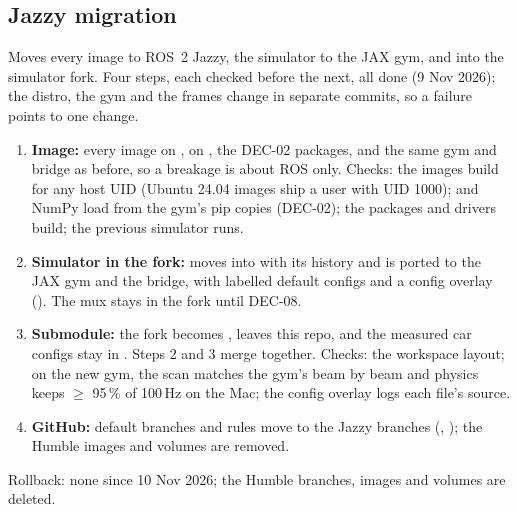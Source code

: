 \documentclass[11pt,a4paper]{article}
\begin{document}
\subsection{Jazzy migration}\label{sec:migration}
Moves every image to ROS~2 Jazzy, the simulator to the JAX gym, and  into the simulator fork. Four steps, each checked before the next, all done (9 Nov 2026); the distro, the gym and the frames change in separate commits, so a failure points to one change.
\begin{enumerate}
  \item \textbf{Image:} every image on ,  on , the DEC-02 packages, and the same gym and bridge as before, so a breakage is about ROS only. Checks: the images build for any host UID (Ubuntu 24.04 images ship a user with UID 1000);  and NumPy load from the gym's pip copies (DEC-02); the packages and drivers build; the previous simulator runs.
  \item \textbf{Simulator in the fork:}  moves into  with its history and is ported to the JAX gym and the  bridge, with labelled default configs and a config overlay (). The mux stays in the fork until DEC-08.
  \item \textbf{Submodule:} the fork becomes ,  leaves this repo, and the measured car configs stay in . Steps 2 and 3 merge together. Checks: the workspace layout; on the new gym, the scan matches the gym's beam by beam and physics keeps $\geq$ 95\,\% of 100\,Hz on the Mac; the config overlay logs each file's source.
  \item \textbf{GitHub:} default branches and rules move to the Jazzy branches (, ); the Humble images and volumes are removed.
\end{enumerate}
Rollback: none since 10 Nov 2026; the Humble branches, images and volumes are deleted.
\end{document}
